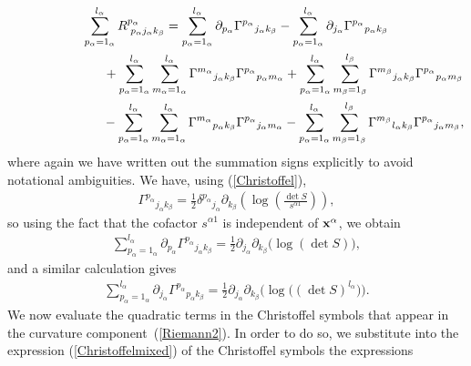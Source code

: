 \documentclass[pdftex]{sigma}
\numberwithin{equation}{section}
\newcommand{\jalpha}{j_{\alpha}}
\newcommand{\kbeta}{k_{\beta}}
\newcommand{\malpha}{m_{\alpha}}
\newcommand{\mbeta}{m_{\beta}}
\newcommand{\lbeta}{l_{\beta}}
\newcommand{\lalpha}{l_{\alpha}}
\newcommand{\palpha}{p_{\alpha}}
\begin{document}
\begin{gather}
\sum_{\palpha=1_{\alpha}}^{\lalpha}R^{\palpha}_{{\phantom l} \palpha \jalpha \kbeta} =\sum_{\palpha=1_{\alpha}}^{\lalpha}\partial_{\palpha}{\Gamma^{\palpha}}_{\jalpha \kbeta}-\sum_{\palpha=1_{\alpha}}^{\lalpha}\partial_{\jalpha}{\Gamma^{\palpha}}_{\palpha \kbeta}\nonumber\\
\hphantom{\sum_{\palpha=1_{\alpha}}^{\lalpha}R^{\palpha}_{{\phantom l} \palpha \jalpha \kbeta} =}{}
+\sum_{\palpha=1_{\alpha}}^{\lalpha}\sum_{\malpha = 1_{\alpha}}^{\lalpha}{\Gamma^{\malpha}}_{\jalpha \kbeta}{\Gamma^{\palpha}}_{\palpha \malpha}+\sum_{\palpha=1_{\alpha}}^{\lalpha}\sum_{\mbeta=1_{\beta}}^{\lbeta}{\Gamma^{\mbeta}}_{\jalpha \kbeta}{\Gamma^{\palpha}}_{\palpha \mbeta}\nonumber\\
\hphantom{\sum_{\palpha=1_{\alpha}}^{\lalpha}R^{\palpha}_{{\phantom l} \palpha \jalpha \kbeta} =}{}-\sum_{\palpha=1_{\alpha}}^{\lalpha}\sum_{\malpha=1_{\alpha}}^{\lalpha}{\Gamma^{\malpha}}_{\palpha \kbeta}{\Gamma^{\palpha}}_{\jalpha \malpha}-\sum_{\palpha=1_{\alpha}}^{\lalpha}\sum_{\mbeta=1_{\beta}}^{\lbeta}{\Gamma^{\mbeta}}_{\lalpha \kbeta}{\Gamma^{\palpha}}_{\jalpha \mbeta},\label{Riemann2}
\end{gather}
where again we have written out the summation signs explicitly to avoid notational ambiguities. We have, using (\ref{Christoffel}),
\begin{gather}\label{moreChristoffel}
{\Gamma^{\palpha}}_{\jalpha \kbeta}=\frac{1}{2}{\delta^{\palpha}}_{\jalpha}\partial_{\kbeta}\left(\log\left(\frac{\det S}{s^{\alpha 1}}\right)\right),
\end{gather}
so using the fact that the cofactor $s^{\alpha 1}$ is independent of ${\bf x}^{\alpha}$, we obtain
\begin{gather}\label{newderiv1}
\sum_{\palpha=1_{\alpha}}^{\lalpha}\partial_{\palpha}{\Gamma^{\palpha}}_{\jalpha \kbeta}=\frac{1}{2}\partial_{\jalpha}\partial_{\kbeta}\big(\log(\det S)\big),
\end{gather}
and a similar calculation gives
\begin{gather}\label{newderiv2}
\sum_{\palpha=1_{\alpha}}^{\lalpha}\partial_{\jalpha}{\Gamma^{\palpha}}_{\palpha \kbeta}=\frac{1}{2}\partial_{\jalpha}\partial_{\kbeta}\big(\log\big((\det S)^{\lalpha}\big)\big).
\end{gather}
We now evaluate the quadratic terms in the Christoffel symbols that appear in the curvature component~(\ref{Riemann2}). In order to do so, we substitute into the expression (\ref{Christoffelmixed}) of the Christoffel symbols the expressions
\end{document}
